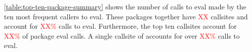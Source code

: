\documentclass[conference]{IEEEtran}
\newcommand{\missingNumber}{\textcolor{red}{XX}\xspace}
\newcommand{\missingPercentage}{\textcolor{red}{XX\%}\xspace}
\begin{document}
\begin{table}[ht]
  \label{table:eval-count-summary}
  \caption{Distribution of eval calls and callsites in the corpus}
\end{table}

\ref{table:top-ten-package-summary} shows the number of calls to eval
made by the ten most frequent callers to eval. These packages together have
\missingNumber callsites and account for \missingPercentage calls to eval.
Furthermore, the top ten callsites account for \missingPercentage of package
eval calls. A single callsite of \TopTenPackageNameA accounts for over
\missingPercentage calls to eval.
\end{document}
